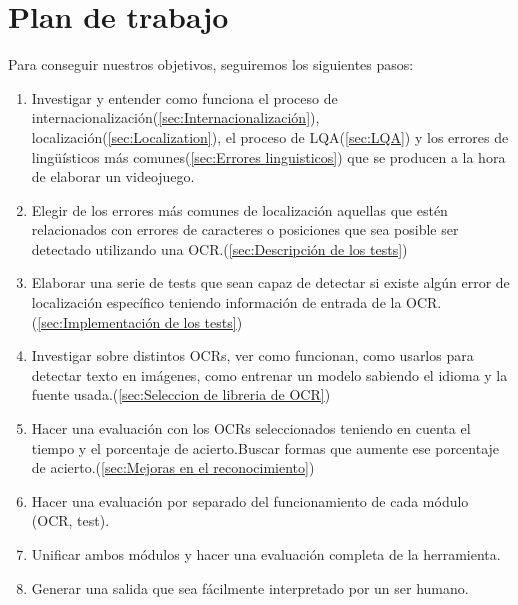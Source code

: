 \section{Plan de trabajo}
Para conseguir nuestros objetivos, seguiremos los siguientes pasos:
\begin{enumerate}
	\item Investigar y entender como funciona el proceso de internacionalización(\ref{sec:Internacionalización}), localización(\ref{sec:Localization}), el proceso de LQA(\ref{sec:LQA}) y los errores de lingüísticos más comunes(\ref{sec:Errores linguisticos}) que se producen a la hora de elaborar un videojuego. 
	\item Elegir de los errores más comunes de localización aquellas que estén relacionados con errores de caracteres o posiciones que sea posible ser detectado utilizando una OCR.(\ref{sec:Descripción de los tests})
	\item Elaborar una serie de tests que sean capaz de detectar si existe algún error de localización específico teniendo información de entrada de la OCR.(\ref{sec:Implementación de los tests})
	\item Investigar sobre distintos OCRs, ver como funcionan, como usarlos para detectar texto en imágenes, como entrenar un modelo sabiendo el idioma y la fuente usada.(\ref{sec:Seleccion de libreria de OCR})
	\item Hacer una evaluación con los OCRs seleccionados teniendo en cuenta el tiempo y el porcentaje de acierto.Buscar formas que aumente ese porcentaje de acierto.(\ref{sec:Mejoras en el reconocimiento})
	\item Hacer una evaluación por separado del funcionamiento de cada módulo (OCR, test).
	\item Unificar ambos módulos y hacer una evaluación completa de la herramienta.
	\item Generar una salida que sea fácilmente interpretado por un ser humano. 
	
\end{enumerate}
